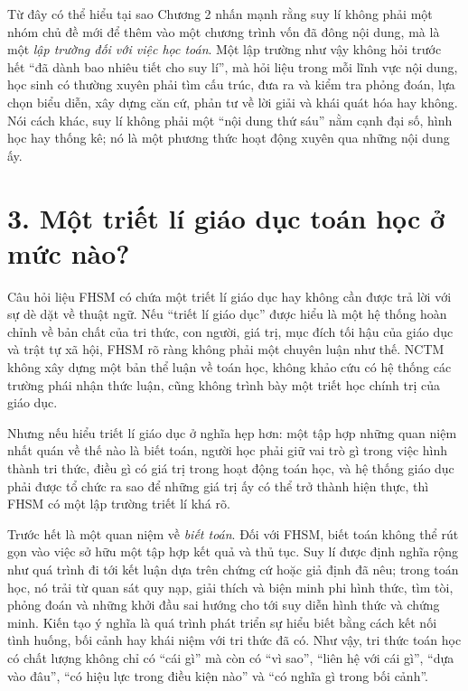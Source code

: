 Từ đây có thể hiểu tại sao Chương 2 nhấn mạnh rằng suy lí không phải một nhóm
chủ đề mới để thêm vào một chương trình vốn đã đông nội dung, mà là một
\emph{lập trường đối với việc học toán}. Một lập trường như vậy không hỏi
trước hết ``đã dành bao nhiêu tiết cho suy lí'', mà hỏi liệu trong mỗi lĩnh
vực nội dung, học sinh có thường xuyên phải tìm cấu trúc, đưa ra và kiểm tra
phỏng đoán, lựa chọn biểu diễn, xây dựng căn cứ, phản tư về lời giải và khái
quát hóa hay không. Nói cách khác, suy lí không phải một ``nội dung thứ sáu''
nằm cạnh đại số, hình học hay thống kê; nó là một phương thức hoạt động xuyên
qua những nội dung ấy.

\section*{3. Một triết lí giáo dục toán học ở mức nào?}

Câu hỏi liệu FHSM có chứa một triết lí giáo dục hay không cần được trả lời với
sự dè dặt về thuật ngữ. Nếu ``triết lí giáo dục'' được hiểu là một hệ thống
hoàn chỉnh về bản chất của tri thức, con người, giá trị, mục đích tối hậu của
giáo dục và trật tự xã hội, FHSM rõ ràng không phải một chuyên luận như thế.
NCTM không xây dựng một bản thể luận về toán học, không khảo cứu có hệ thống
các trường phái nhận thức luận, cũng không trình bày một triết học chính trị
của giáo dục.

Nhưng nếu hiểu triết lí giáo dục ở nghĩa hẹp hơn: một tập hợp những quan niệm
nhất quán về thế nào là biết toán, người học phải giữ vai trò gì trong việc
hình thành tri thức, điều gì có giá trị trong hoạt động toán học, và hệ thống
giáo dục phải được tổ chức ra sao để những giá trị ấy có thể trở thành hiện
thực, thì FHSM có một lập trường triết lí khá rõ.

Trước hết là một quan niệm về \emph{biết toán}. Đối với FHSM, biết toán không
thể rút gọn vào việc sở hữu một tập hợp kết quả và thủ tục. Suy lí được định
nghĩa rộng như quá trình đi tới kết luận dựa trên chứng cứ hoặc giả định đã
nêu; trong toán học, nó trải từ quan sát quy nạp, giải thích và biện minh phi
hình thức, tìm tòi, phỏng đoán và những khởi đầu sai hướng cho tới suy diễn
hình thức và chứng minh. Kiến tạo ý nghĩa là quá trình phát triển sự hiểu biết
bằng cách kết nối tình huống, bối cảnh hay khái niệm với tri thức đã có.
Như vậy, tri thức toán học có chất lượng không chỉ có ``cái gì'' mà còn có
``vì sao'', ``liên hệ với cái gì'', ``dựa vào đâu'', ``có hiệu lực trong điều
kiện nào'' và ``có nghĩa gì trong bối cảnh''.

